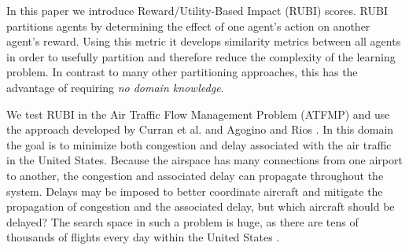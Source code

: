 \documentclass[letterpaper]{article}
\begin{document}


In this paper we introduce Reward/Utility-Based Impact (RUBI) scores. RUBI partitions agents by determining the effect of one agent's action on another agent's reward. Using this metric it develops similarity metrics between all agents in order to usefully partition and therefore reduce the complexity of the learning problem. In contrast to many other partitioning approaches, this has the advantage of requiring \textit{no domain knowledge}.

We test RUBI in the Air Traffic Flow Management Problem (ATFMP) and use the approach developed by Curran et al. \cite{Curran:2013:AHC:2484920.2485183} and Agogino and Rios \cite{Agogino:2009:EEM:1570256.1570258,Rios}. In this domain the goal is to minimize both congestion and delay associated with the air traffic in the United States. Because the airspace has many connections from one airport to another, the congestion and associated delay can propagate throughout the system. Delays may be imposed to better coordinate aircraft and mitigate the propagation of congestion and the associated delay, but which aircraft should be delayed? The search space in such a problem is huge, as there are tens of thousands of flights every day within the United States \cite{faa05}.

\end{document}

